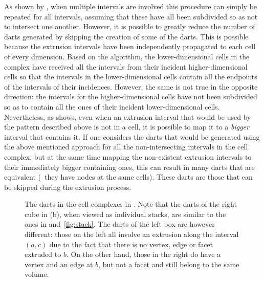As shown by \citet{Ferrucci93}, when multiple intervals are involved this procedure can simply be repeated for all intervals, assuming that these have all been subdivided so as not to intersect one another.
However, it is possible to greatly reduce the number of darts generated by skipping the creation of some of the darts.
This is possible because the extrusion intervals have been independently propagated to each cell of every dimension.
Based on the algorithm, the lower-dimensional cells in the complex have received all the intervals from their incident higher-dimensional cells so that the intervals in the lower-dimensional cells contain all the endpoints of the intervals of their incidences.
However, the same is not true in the opposite direction: the intervals for the higher-dimensional cells have not been subdivided so as to contain all the ones of their incident lower-dimensional cells.
Nevertheless, as  shows, even when an extrusion interval that would be used by the pattern described above is not in a cell, it is possible to map it to a \emph{bigger} interval that contains it.
If one considers the darts that would be generated using the above mentioned approach for all the non-intersecting intervals in the cell complex, but at the same time mapping the non-existent extrusion intervals to their immediately bigger containing ones, this can result in many darts that are equivalent (\ie\ they have nodes at the same cells).
These darts are those that can be skipped during the extrusion process.
\begin{figure}[tbp]
\centering
{}
\quad
{}
\caption[The darts in the cell complexes in ]{The darts in the cell complexes in .
Note that the darts of the right cube in (b), when viewed as individual stacks, are similar to the ones in  and~\ref{fig:stack}.
The darts of the left box are however different: those on the left all involve an extrusion along the interval $(a,c)$ due to the fact that there is no vertex, edge or facet extruded to $b$.
On the other hand, those in the right do have a vertex and an edge at $b$, but not a facet and still belong to the same volume.}
\label{fig:blocks}
\end{figure}

